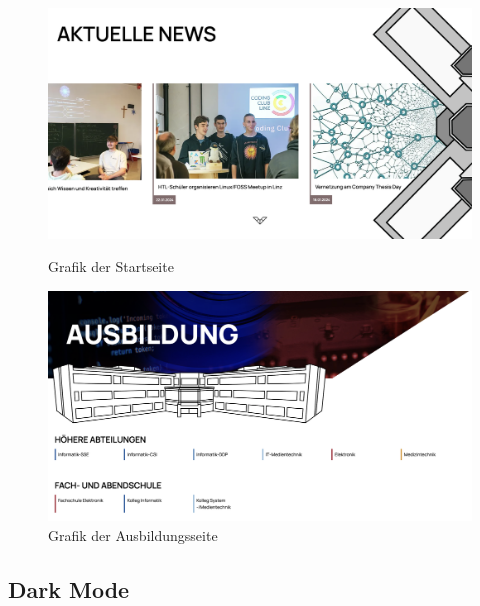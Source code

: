 \begin{figure}
   \begin{minipage}[b]{.4\linewidth} 
      \includegraphics[width=\linewidth]{pics/grafik-start.png}
      \caption{Grafik der Startseite}
      \label{fig:impl:grafik:start}
   \end{minipage}
   \hspace{.05\linewidth}
   \begin{minipage}[b]{.4\linewidth}
      \includegraphics[width=\linewidth]{pics/grafik-ausbildung.png}
      \caption{Grafik der Ausbildungsseite}
      \label{fig:impl:grafik:ausbildung}
   \end{minipage}
\end{figure}


\subsection{Dark Mode}

